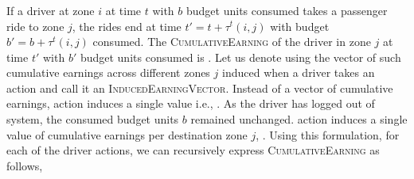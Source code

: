 \subsubsection{}

If a driver at zone $i$ at time $t$ with $b$ budget units consumed takes a passenger ride to zone $j$, the rides end at time 
$t' = t + \tau^t(i,j)$ with budget $b' = b + \tau^t(i,j)$ consumed. The \textsc{CumulativeEarning} of the driver in zone $j$ at time $t'$ with $b'$
budget units consumed is {}. Let us denote using {} the vector of such
cumulative earnings across different zones $j$ induced when a driver takes an action {\getpassengeraction} and call it an 
\textsc{InducedEarningVector}. Instead of a vector of cumulative earnings, {\gohome} action induces a single value i.e., {}. 
As the driver has logged out of system, the consumed budget units $b$ remained unchanged. {\relocate} action induces a single value of cumulative earnings per destination zone $j$, {}. 
Using this formulation, for each of the driver actions, we can recursively express \textsc{CumulativeEarning} as follows,
